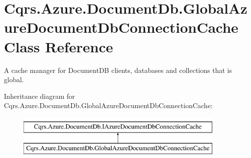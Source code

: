 \hypertarget{classCqrs_1_1Azure_1_1DocumentDb_1_1GlobalAzureDocumentDbConnectionCache}{}\section{Cqrs.\+Azure.\+Document\+Db.\+Global\+Azure\+Document\+Db\+Connection\+Cache Class Reference}
\label{classCqrs_1_1Azure_1_1DocumentDb_1_1GlobalAzureDocumentDbConnectionCache}


A cache manager for Document\+DB clients, databases and collections that is global.  


Inheritance diagram for Cqrs.\+Azure.\+Document\+Db.\+Global\+Azure\+Document\+Db\+Connection\+Cache\+:\begin{figure}[H]
\begin{center}
\leavevmode
\includegraphics[height=2.000000cm]{classCqrs_1_1Azure_1_1DocumentDb_1_1GlobalAzureDocumentDbConnectionCache}
\end{center}
\end{figure}
